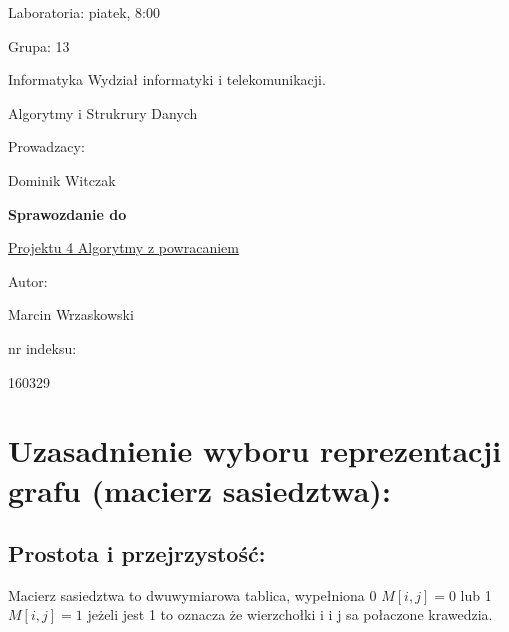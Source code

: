 \documentclass[12pt]{article}
\begin{document}
\begin{flushright}

Laboratoria: piatek, 8:00

Grupa: 13

Informatyka Wydział informatyki i telekomunikacji.

\end{flushright}

\hspace{4cm}

\begin{center}

Algorytmy i Strukrury Danych

Prowadzacy:

Dominik Witczak

\end{center}

\hspace{4cm}

\begin{center}

\textbf{Sprawozdanie do \LARGE}

\hspace{2cm}

\underline{Projektu 4 Algorytmy z powracaniem}

\end{center}

\hspace{30cm}

\begin{flushright}

Autor:

Marcin Wrzaskowski

nr indeksu:

160329

\end{flushright}

\pagebreak

\section{Uzasadnienie wyboru reprezentacji grafu (macierz sasiedztwa): }

    \subsection{Prostota i przejrzystość:}
        Macierz sasiedztwa to dwuwymiarowa tablica, wypełniona 0 $ M[i, j] = 0$ lub 1 $ M[i, j] = 1 $ jeżeli jest 1 to oznacza że wierzchołki i i j sa połaczone krawedzia.
\end{document}
